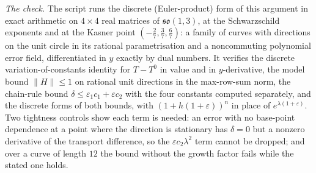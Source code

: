\emph{The check.} The script runs the discrete (Euler-product) form of this argument in exact arithmetic on $4 \times 4$ real matrices of $\mathfrak{so}(1,3)$, at the Schwarzschild exponents and at the Kasner point $(-\tfrac27, \tfrac37, \tfrac67)$: a family of curves with directions on the unit circle in its rational parametrisation and a noncommuting polynomial error field, differentiated in $y$ exactly by dual numbers. It verifies the discrete variation-of-constants identity for $T - T^{0}$ in value and in $y$-derivative, the model bound $\|H\| \le 1$ on rational unit directions in the max-row-sum norm, the chain-rule bound $\delta \le \varepsilon_{1}c_{1} + \varepsilon c_{2}$ with the four constants computed separately, and the discrete forms of both bounds, with $(1 + h(1 + \varepsilon))^{n}$ in place of $e^{\lambda(1+\varepsilon)}$. Two tightness controls show each term is needed: an error with no base-point dependence at a point where the direction is stationary has $\delta = 0$ but a nonzero derivative of the transport difference, so the $\varepsilon c_{2}\lambda^{2}$ term cannot be dropped; and over a curve of length $12$ the bound without the growth factor fails while the stated one holds.
